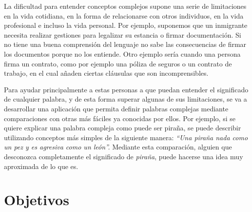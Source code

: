 La dificultad para entender conceptos complejos supone una serie de limitaciones en la vida cotidiana, en la forma de relacionarse con otros individuos, en la vida profesional e incluso la vida personal. Por ejemplo, suponemos que un inmigrante necesita realizar gestiones para legalizar su estancia o firmar documentación. Si no tiene una buena comprensión del lenguaje no sabe las consecuencias de firmar los documentos porque no los entiende. 
Otro ejemplo sería cuando una persona firma un contrato, como por ejemplo una póliza de seguros o un contrato de trabajo, en el cual añaden ciertas cláusulas que son incomprensibles. 


Para ayudar principalmente a estas personas a que puedan entender el significado de cualquier palabra, y de esta forma superar algunas de sus limitaciones, se va a desarrollar una aplicación que permita definir palabras complejas mediante comparaciones con otras más fáciles ya conocidas por ellos. Por ejemplo, si se quiere explicar una palabra compleja como puede ser piraña, se puede describir utilizando conceptos más simples de la siguiente manera:\textit{ ``Una piraña nada como un pez y es agresiva como un león''.} Mediante esta comparación, alguien que desconozca completamente el significado de \textit{piraña}, puede hacerse una idea muy aproximada de lo que es.


\section{Objetivos}
\label{cap:sec:objetivos}


